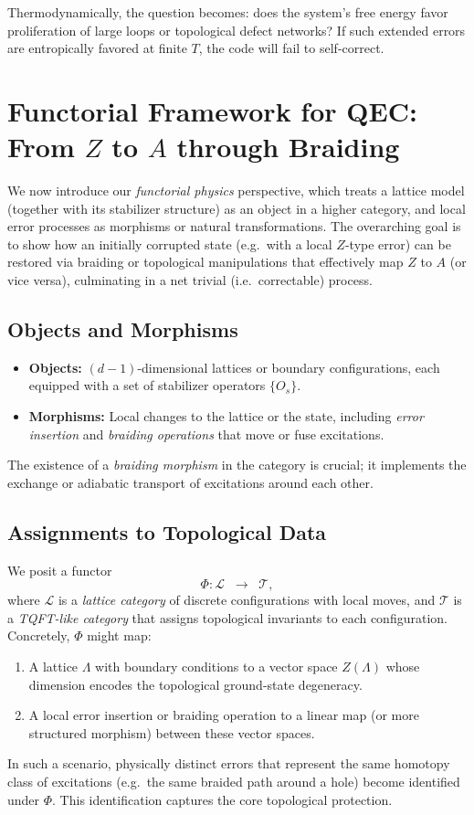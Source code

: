 \documentclass[12pt]{article}
\begin{document}
Thermodynamically, the question becomes: does the system’s free energy favor proliferation of large loops or topological defect networks? If such extended errors are entropically favored at finite $T$, the code will fail to self-correct.

\section{Functorial Framework for QEC: From $Z$ to $A$ through Braiding}\label{sec:functorial_framework}
We now introduce our \emph{functorial physics} perspective, which treats a lattice model (together with its stabilizer structure) as an object in a higher category, and local error processes as morphisms or natural transformations. The overarching goal is to show how an initially corrupted state (e.g.\ with a local $Z$-type error) can be restored via braiding or topological manipulations that effectively map $Z$ to $A$ (or vice versa), culminating in a net trivial (i.e.\ correctable) process.

\subsection{Objects and Morphisms}
\begin{itemize}
    \item \textbf{Objects:} $(d-1)$-dimensional lattices or boundary configurations, each equipped with a set of stabilizer operators $\{O_s\}$. 
    \item \textbf{Morphisms:} Local changes to the lattice or the state, including \emph{error insertion} and \emph{braiding operations} that move or fuse excitations.
\end{itemize}
The existence of a \emph{braiding morphism} in the category is crucial; it implements the exchange or adiabatic transport of excitations around each other. 

\subsection{Assignments to Topological Data}
We posit a functor
\[
\Phi : \mathcal{L} \;\; \longrightarrow \;\; \mathcal{T},
\]
where $\mathcal{L}$ is a \emph{lattice category} of discrete configurations with local moves, and $\mathcal{T}$ is a \emph{TQFT-like category} that assigns topological invariants to each configuration. Concretely, $\Phi$ might map:
\begin{enumerate}
    \item A lattice $\Lambda$ with boundary conditions to a vector space $Z(\Lambda)$ whose dimension encodes the topological ground-state degeneracy.
    \item A local error insertion or braiding operation to a linear map (or more structured morphism) between these vector spaces.
\end{enumerate}
In such a scenario, physically distinct errors that represent the same homotopy class of excitations (e.g.\ the same braided path around a hole) become identified under $\Phi$. This identification captures the core topological protection.
\end{document}
